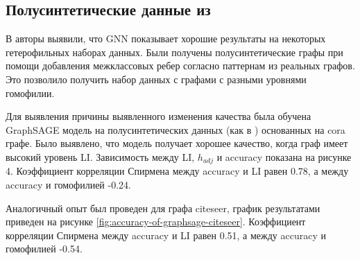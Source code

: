 \documentclass[a4paper,14pt]{article}
\begin{document}
	\subsection{Полусинтетические данные из \cite{ma2021homophily}}
	
	В \cite{ma2021homophily} авторы выявили, что GNN показывает хорошие результаты на некоторых гетерофильных наборах данных.
	Были получены полусинтетические графы при помощи добавления межклассовых ребер согласно паттернам из реальных графов.
	Это позволило получить набор данных с графами с разными уровнями гомофилии.
	
	Для выявления причины выявленного изменения качества была обучена GraphSAGE модель на полусинтетических данных (как в \cite{ma2021homophily}) основанных на cora графе.
	Было выявлено, что модель получает хорошее качество, когда граф имеет высокий уровень LI.
	Зависимость между LI, $h_{adj}$ и accuracy показана на рисунке 4. 
	Коэффициент корреляции Спирмена между accuracy и LI равен 0.78, а между accuracy и гомофилией -0.24. 
	
	
	Аналогичный опыт был проведен для графа citeseer, график результатами приведен на рисунке \ref{fig:accuracy-of-graphsage-citeseer}.
	Коэффициент корреляции Спирмена между accuracy и LI равен 0.51, а между accuracy и гомофилией -0.54.
	
\end{document}
